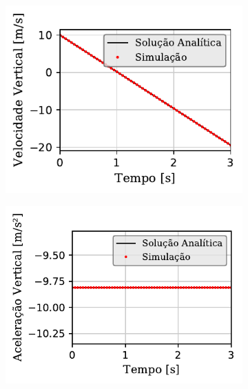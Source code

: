 \begin{figure}[htb!]
{\begin{subfigure}[t]{\smallresultsfigwidth}
			\caption{}
			\label{subfig:x_velocity}
		\end{subfigure}
		\begin{subfigure}[t]{\smallresultsfigwidth}
			\centering
			\includegraphics[scale=1]{images/falling_sphere/correct_initial_acceleration/y_velocity.pdf}
			\caption{}
			\label{subfig:y_velocity}
		\end{subfigure}
		\begin{subfigure}[t]{\smallresultsfigwidth}
			\centering
			\includegraphics[scale=1]{images/falling_sphere/correct_initial_acceleration/y_acceleration.pdf}
			\caption{}
			\label{subfig:y_acceleration}
		\end{subfigure}
	}
	\label{fig:falling_sphere_other}
	\sourceMe
\end{figure}

